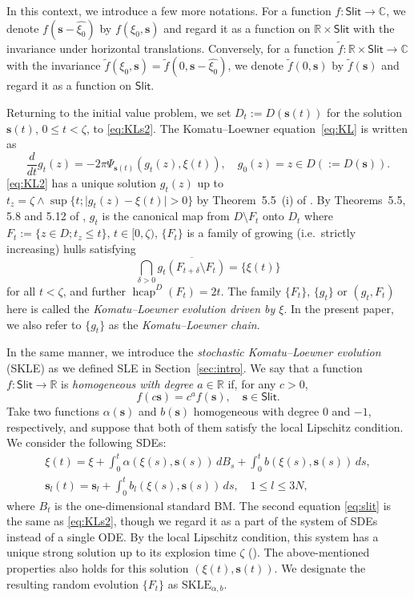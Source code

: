 \documentclass[preprint,12pt]{elsarticle}
\theoremstyle{definition}
\newcommand{\R}{\mathbb{R}}
\newcommand{\C}{\mathbb{C}}
\newcommand{\skle}{\mathrm{SKLE}}
\newcommand{\Slit}{\mathsf{Slit}}
\newcommand{\slit}{\mathbf{s}}
\DeclareMathOperator{\hcap}{hcap}
\begin{document}
In this context, we introduce a few more notations.
For a function $f \colon \Slit \to \C$,
we denote $f(\slit - \widehat{\xi_0})$ by $f(\xi_0, \slit)$
and regard it as a function on $\R \times \Slit$
with the invariance under horizontal translations.
Conversely, for a function $\tilde{f} \colon \R \times \Slit \to \C$
with the invariance $\tilde{f}(\xi_0, \slit)=\tilde{f}(0, \slit-\widehat{\xi_0})$,
we denote $\tilde{f}(0, \slit)$ by $\tilde{f}(\slit)$
and regard it as a function on $\Slit$.

Returning to the initial value problem, we set $D_t:=D(\slit(t))$
for the solution $\slit(t)$, $0 \leq t < \zeta$, to \eqref{eq:KLs2}.
The Komatu--Loewner equation~\eqref{eq:KL} is written as
\begin{equation} \label{eq:KL2}
\frac{d}{dt}g_{t}(z) = -2\pi \Psi_{\slit(t)}(g_{t}(z),\xi(t)), \quad g_{0}(z)=z \in D(:=D(\slit)).
\end{equation}
\eqref{eq:KL2} has a unique solution $g_t(z)$ up to
$t_z = \zeta \wedge \sup\{t; \lvert g_t(z) - \xi(t) \rvert >0\}$
by Theorem~5.5~(i) of \cite{CF18}.
By Theorems~5.5, 5.8 and 5.12 of \cite{CF18},
$g_t$ is the canonical map from $D \setminus F_t$ onto $D_t$
where $F_t:=\{z \in D; t_z \leq t\}$, $t \in [0, \zeta)$,
$\{F_t\}$ is a family of growing (i.e.\ strictly increasing) hulls satisfying
\begin{equation} \label{eq:hull_limit}
\bigcap_{\delta>0}\overline{g_t(F_{t+\delta} \setminus F_t)} = \{\xi(t)\}
\end{equation}
for all $t < \zeta$, and further $\hcap^D(F_t)=2t$.
The family $\{F_t\}$, $\{g_t\}$ or $(g_t, F_t)$ here is called
the \emph{Komatu--Loewner evolution driven by $\xi$}.
In the present paper,
we also refer to $\{g_t\}$ as the \emph{Komatu--Loewner chain}.

In the same manner, we introduce
the \emph{stochastic Komatu--Loewner evolution} (SKLE)
as we defined SLE in Section~\ref{sec:intro}.
We say that a function $f \colon \Slit \to \R$ is
\emph{homogeneous with degree $a \in \R$} if, for any $c>0$,
\[
f(c\slit) = c^af(\slit),\quad \slit \in \Slit.
\]
Take two functions $\alpha(\slit)$ and $b(\slit)$ homogeneous
with degree $0$ and $-1$, respectively, and suppose that
both of them satisfy the local Lipschitz condition.
We consider the following SDEs:
\begin{gather}
\xi(t) = \xi + \int_0^t \alpha(\xi(s), \slit(s))\,dB_s
	+ \int_0^t b(\xi(s), \slit(s))\,ds, \label{eq:driv}\\
\slit_l(t)=\slit_l + \int_0^t b_l(\xi(s), \slit(s))\,ds,\quad 1 \leq l \leq 3N, \label{eq:slit}
\end{gather}
where $B_t$ is the one-dimensional standard BM.
The second equation \eqref{eq:slit} is the same as \eqref{eq:KLs2},
though we regard it as a part of the system of SDEs instead of a single ODE.
By the local Lipschitz condition, this system has a unique strong solution
up to its explosion time $\zeta$ (\cite[Theorem~4.2]{CF18}).
The above-mentioned properties also holds for this solution $(\xi(t), \slit(t))$.
We designate the resulting random evolution $\{F_t\}$ as $\skle_{\alpha, b}$.
\end{document}
